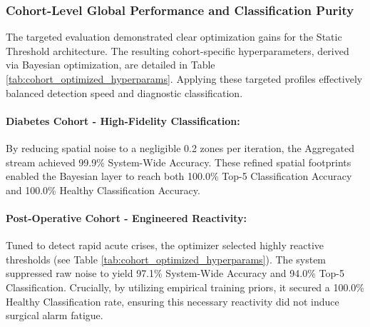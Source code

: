 \documentclass[sigconf]{acmart}
\begin{document}
\subsubsection{Cohort-Level Global Performance and Classification Purity}
The targeted evaluation demonstrated clear optimization gains for the Static Threshold architecture. The resulting cohort-specific hyperparameters, derived via Bayesian optimization, are detailed in Table \ref{tab:cohort_optimized_hyperparams}. Applying these targeted profiles effectively balanced detection speed and diagnostic classification.

\paragraph{Diabetes Cohort - High-Fidelity Classification:}
By reducing spatial noise to a negligible 0.2 zones per iteration, the Aggregated stream achieved 99.9\% System-Wide Accuracy. These refined spatial footprints enabled the Bayesian layer to reach both 100.0\% Top-5 Classification Accuracy and 100.0\% Healthy Classification Accuracy.

\paragraph{Post-Operative Cohort - Engineered Reactivity:}
Tuned to detect rapid acute crises, the optimizer selected highly reactive thresholds (see Table \ref{tab:cohort_optimized_hyperparams}). The system suppressed raw noise to yield 97.1\% System-Wide Accuracy and 94.0\% Top-5 Classification. Crucially, by utilizing empirical training priors, it secured a 100.0\% Healthy Classification rate, ensuring this necessary reactivity did not induce surgical alarm fatigue.
\end{document}
